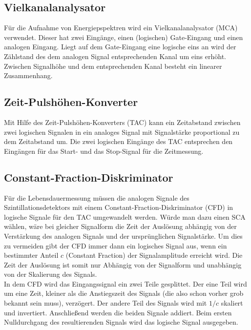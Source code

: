 \subsection{Vielkanalanalysator}
Für die Aufnahme von Energiepspektren wird ein Vielkanalanalysator (MCA) verwendet. Dieser hat zwei Eingänge, einen (logischen) Gate-Eingang und einen analogen Eingang. Liegt auf dem Gate-Eingang eine logische eins an wird der Zählstand des dem analogen Signal entsprechenden Kanal um eins erhöht. Zwischen Signalhöhe und dem entsprechenden Kanal besteht ein linearer Zusammenhang. 

\subsection{Zeit-Pulshöhen-Konverter}
Mit Hilfe des Zeit-Pulshöhen-Konverters (TAC) kann ein Zeitabstand zwischen zwei logischen Signalen in ein analoges Signal mit Signalstärke proportional zu dem Zeitabstand um. Die zwei logischen Eingänge des TAC entsprechen den Eingängen für das Start- und das Stop-Signal für die Zeitmessung. 

\subsection{Constant-Fraction-Diskriminator}
Für die Lebensdauermessung müssen die analogen Signale des Szintillationsdetektors mit einem Constant-Fraction-Diskriminator (CFD) in logische Signale für den TAC umgewandelt werden. Würde man dazu einen SCA wählen, wäre bei gleicher Signalform die Zeit der Auslösung abhängig von der Verstärkung des analogen Signals und der ursprünglichen Signalstärke. Um dies zu vermeiden gibt der CFD immer dann ein logisches Signal aus, wenn ein bestimmter Anteil $c$ (Constant Fraction) der Signalamplitude erreicht wird. Die Zeit der Auslösung ist somit nur Abhängig von der Signalform und unabhängig von der Skalierung des Signals. \\

In dem CFD wird das Eingangssignal ein zwei Teile gesplittet. Der eine Teil wird um eine Zeit, kleiner als die Anstiegszeit des Signals (die also schon vorher grob bekannt sein muss), verzögert. Der andere Teil des Signals wird mit $1/c$ skaliert und invertiert. Anschließend werden die beiden Signale addiert. Beim ersten Nulldurchgang des resultierenden Signals wird das logische Signal ausgegeben.

